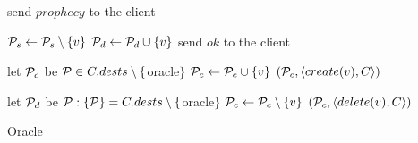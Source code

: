 \begin{algorithm}[t!]
\begin{distribalgo}[1]
            \ENDIF
            
            \STATE send $prophecy$ to the client

        \vspace{1.5mm}

                \STATE $\mathcal{P}_s \leftarrow \mathcal{P}_s \setminus \{v\}$
                \STATE $\mathcal{P}_d \leftarrow \mathcal{P}_d \cup      \{v\}$
                \STATE send $ok$ to the client

        \vspace{1.0mm}
    
            \STATE let $\mathcal{P}_c$ be $\mathcal{P} \in C.dests \setminus \{$oracle$\}$
            \STATE $\mathcal{P}_c \leftarrow \mathcal{P}_c \cup      \{v\}$
            \STATE \rmcast$(\mathcal{P}_c, \langle create(v), C \rangle )$
        
        \vspace{1.0mm}
        
            \STATE let $\mathcal{P}_d$ be $\mathcal{P} : \{\mathcal{P}\} = C.dests \setminus \{$oracle$\}$
            \STATE $\mathcal{P}_c \leftarrow \mathcal{P}_c \setminus      \{v\}$
             \STATE \rmcast$(\mathcal{P}_c, \langle delete(v), C \rangle )$
           
            
        \ENDIF
    \ENDINDENT
\ENDINDENT

\caption{Oracle}
\label{alg:oracle_proxy}
\end{distribalgo}
\end{algorithm}